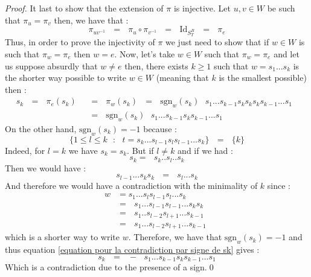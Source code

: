 \documentclass[envcountsame,envcountchap]{svmono}
\newcommand{\qq}{\text{ }}
\begin{document}
\begin{proof}
	It last to show that the extension of $\pi$ is injective. Let $u,v\in W$ be such that $\pi_u=\pi_v$ then, we have that :
	\begin{equation}
	\pi_{uv^{-1}}\qq=\qq \pi_u\circ \pi_{v^{-1}}\qq=\qq \mbox{Id}_{S_T^B}\qq=\qq  \pi_e
	\end{equation}
	Thus, in order to prove the injectivity of $\pi$ we just need to show that if $w\in W$ is such that $\pi_w=\pi_e$ then $w=e$. Now, let's take $w\in W$ such that $\pi_w=\pi_e$ and let us suppose absurdly that $w\not=e$ then, there exists $k\geq 1$ such that $w=s_1...s_k$ is the shorter way possible to write $w\in W$ (meaning that $k$ is the smallest possible) then :
	\begin{equation}\label{equation pour la contradiction par signe de sk}
	\begin{split}
		s_k\qq=\qq\pi_e(s_k)\qq&=\qq \pi_w(s_k)\qq =\qq\mbox{sgn}_w(s_k)\qq s_1...s_{k-1}s_ks_ks_ks_{k-1}...s_1\qq\\
		&=\qq\mbox{sgn}_w(s_k)\qq s_1...s_{k-1}s_ks_{k-1}...s_1
	\end{split}
	\end{equation}
	On the other hand, $\mbox{sgn}_w(s_k)=-1$ because :
	\begin{equation}
	\{1\leq l\leq k\qq :\qq t=s_k...s_{l-1}s_l s_{l-1}...s_k\}\qq=\qq \{k\}
	\end{equation} 
	Indeed, for $l=k$ we have $s_k=s_k$. But if $l\not=k$ and if we had :
	\begin{equation}
	s_k=\qq s_k..s_l..s_k
	\end{equation}
	Then we would have :
	\begin{equation}
	s_{l-1}...s_ks_k\qq=\qq s_l...s_k
	\end{equation}
	And therefore  we would have a contradiction with the minimality of $k$ since :
	\begin{equation}
	\begin{split}
	w&=s_1...s_ls_{l-1}s_l...s_k\qq\\
	&=\qq s_1...s_{l-1}s_{l-1}...s_ks_k\qq\\
	&=\qq s_1..s_{l-2}s_{l+1}...s_{k-1}\qq\\
	&=\qq s_1...s_{l-2}s_{l+1}...s_{k-1}
	\end{split}
	\end{equation}
	which is a shorter way to write $w$. Therefore, we have that $\mbox{sgn}_w(s_k)=-1$ and thus equation \ref{equation pour la contradiction par signe de sk} gives :
	\begin{equation}
			s_k\qq=\qq -\qq  s_1...s_{k-1}s_ks_{k-1}...s_1
	\end{equation}
	Which is a contradiction due to the presence of a sign.\qed
	\end{proof}
\end{document}
